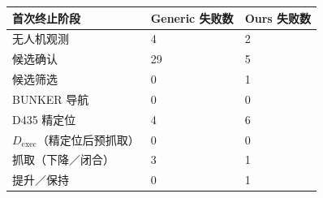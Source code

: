 \begin{tabular}{lll}
\toprule
首次终止阶段 & Generic 失败数 & Ours 失败数 \\
\midrule
无人机观测 & 4 & 2 \\
候选确认 & 29 & 5 \\
候选筛选 & 0 & 1 \\
BUNKER 导航 & 0 & 0 \\
D435 精定位 & 4 & 6 \\
$D_{\mathrm{exec}}$（精定位后预抓取） & 0 & 0 \\
抓取（下降／闭合） & 3 & 1 \\
提升／保持 & 0 & 1 \\
\bottomrule
\end{tabular}
